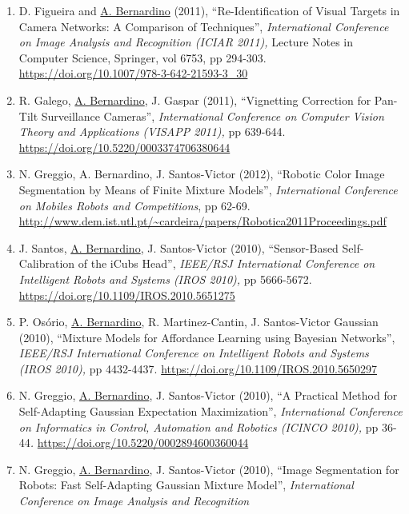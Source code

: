 \documentclass[
]{article}
\begin{document}
\begin{enumerate}
  N. Greggio, J. Gaspar, \ul{A. Bernardino}, J. Santos-Victor (2011),
  ``Monocular vs Binocular 3D Real-Time Ball Tracking From 2d
  Ellipses'', \emph{International Conference on Informatics in Control,
  Automation and Robotics (ICINCO 2011),} pp 67-73.
  \url{https://doi.org/10.5220/0003543400670073}~~~
\item
  D. Figueira and \ul{A. Bernardino} (2011), ``Re-Identification of
  Visual Targets in Camera Networks: A Comparison of Techniques'',
  \emph{International Conference on Image Analysis and Recognition
  (ICIAR 2011),} Lecture Notes in Computer Science, Springer, vol 6753,
  pp 294-303. \url{https://doi.org/10.1007/978-3-642-21593-3_30}~
\item
  R. Galego, \ul{A. Bernardino}, J. Gaspar (2011), ``Vignetting
  Correction for Pan-Tilt Surveillance Cameras'', \emph{International
  Conference on Computer Vision Theory and Applications (VISAPP 2011),}
  pp 639-644. \url{https://doi.org/10.5220/0003374706380644}
\item
  N. Greggio, A. Bernardino, J. Santos-Victor (2012), ``Robotic Color
  Image Segmentation by Means of Finite Mixture Models'',
  \emph{International Conference on Mobiles Robots and Competitions}, pp
  62-69.
  \url{http://www.dem.ist.utl.pt/~cardeira/papers/Robotica2011Proceedings.pdf}
  ~
\item
  J. Santos, \ul{A. Bernardino}, J. Santos-Victor (2010), ``Sensor-Based
  Self-Calibration of the iCub\textquotesingle s Head'', \emph{IEEE/RSJ
  International Conference on Intelligent Robots and Systems (IROS
  2010),} pp 5666-5672. \url{https://doi.org/10.1109/IROS.2010.5651275}~
\item
  P. Osório, \ul{A. Bernardino}, R. Martinez-Cantin, J. Santos-Victor
  Gaussian (2010), ``Mixture Models for Affordance Learning using
  Bayesian Networks'', \emph{IEEE/RSJ International Conference on
  Intelligent Robots and Systems (IROS 2010),} pp 4432-4437.
  \url{https://doi.org/10.1109/IROS.2010.5650297}~
\item
  N. Greggio, \ul{A. Bernardino}, J. Santos-Victor (2010), ``A Practical
  Method for Self-Adapting Gaussian Expectation Maximization'',
  \emph{International Conference on Informatics in Control, Automation
  and Robotics (ICINCO 2010),} pp 36-44\emph{.}
  \url{https://doi.org/10.5220/0002894600360044}~
\item
  N. Greggio, \ul{A. Bernardino}, J. Santos-Victor (2010), ``Image
  Segmentation for Robots: Fast Self-Adapting Gaussian Mixture Model'',
  \emph{International Conference on Image Analysis and Recognition
}
\end{enumerate}
\end{document}
